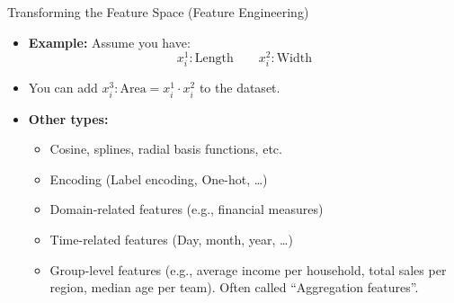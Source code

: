 \begin{frame}{Transforming the Feature Space (Feature Engineering)}
\begin{itemize}
    \item \textbf{Example:} Assume you have: 
    \[
    x_i^1: \text{Length} \qquad x_i^2: \text{Width}
    \]
    
    \item You can add \( x_i^3: \text{Area} = x_i^1 \cdot x_i^2 \) to the dataset.
    
    \item \textbf{Other types:}
    \begin{itemize}
        \item Cosine, splines, radial basis functions, etc.
        \item Encoding (Label encoding, One-hot, \dots)
        \item Domain-related features (e.g., financial measures)
        \item Time-related features (Day, month, year, \dots)
        \item Group-level features (e.g., average income per household, total sales per region, median age per team). Often called ``Aggregation features''.
    \end{itemize}
\end{itemize}
\end{frame}

